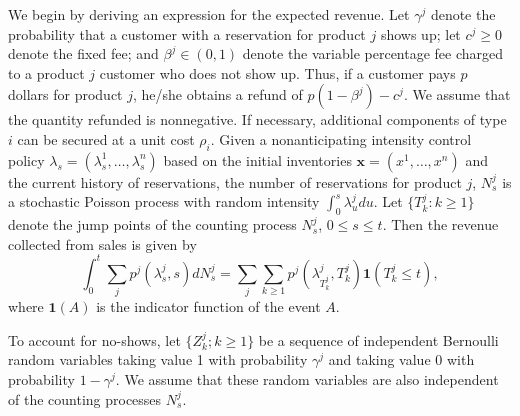 We begin by deriving an expression for the expected revenue. Let \(\gamma^{j}\) denote the probability that a customer with a reservation for product \(j\) shows up; let \(c^{j} \geqslant 0\) denote the fixed fee; and \(\beta^{j} \in (0, 1)\) denote the variable percentage fee charged to a product \(j\) customer who does not show up. Thus, if a customer pays \(p\) dollars for product \(j\), he/she obtains a refund of \(p (1 - \beta^{j}) - c^{j}\). We assume that the quantity refunded is nonnegative. If necessary, additional components of type \(i\) can be secured at a unit cost \(\rho_{i}\). Given a nonanticipating intensity control policy \(\lambda_s = (\lambda_s^{1}, \ldots, \lambda_s^{n})\) based on the initial inventories \(\boldsymbol{x} = (x^{1}, \ldots, x^{n})\) and the current history of reservations, the number of reservations for product \(j\), \(N_s^{j}\) is a stochastic Poisson process with random intensity \(\int_{0}^{s} \lambda_u^{j} du\). Let \(\{ T_k^{j} : k \geqslant 1 \}\) denote the jump points of the counting process \(N_s^{j}\), \(0 \leqslant s \leqslant t\). Then the revenue collected from sales is given by
\[
\int_{0}^{t} \sum_{j} p^{j} (\lambda_s^{j}, s)  dN_s^{j} = \sum_{j} \sum_{k \geqslant 1} p^{j} (\lambda_{T_k^{j}}^{j}, T_k^{j}) \mathbf{1} (T_k^{j} \leqslant t) ,
\]
where \(\mathbf{1}(A)\) is the indicator function of the event \(A\).

To account for no-shows, let \(\{ Z_k^{j} ; k \ge 1 \}\) be a sequence of independent Bernoulli random variables taking value 1 with probability \(\gamma^{j}\) and taking value 0 with probability \(1 - \gamma^{j}\). We assume that these random variables are also independent of the counting processes \(N_s^{j}\).

